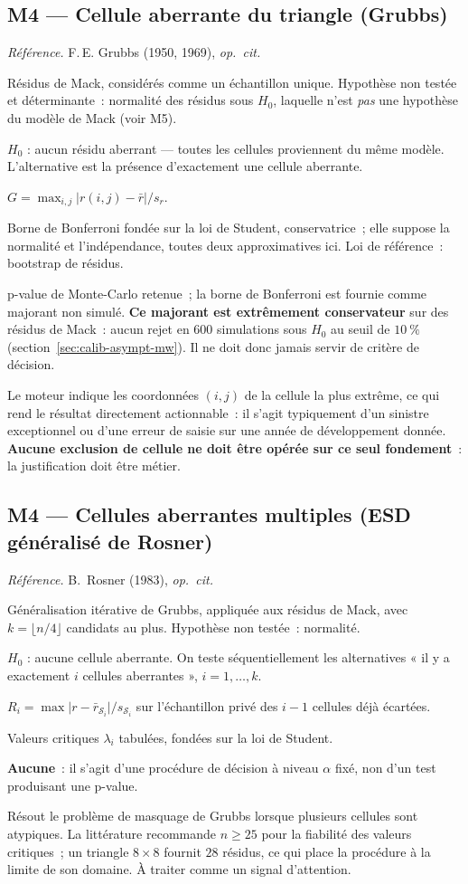 \documentclass[a4paper,11pt]{article}
\newcommand{\refl}[1]{{\small\textcolor{maincolor!70!black}{\textit{Référence.} #1}}\par\smallskip}
\newcounter{ficheid}
\newenvironment{fiche}[1]{%
  \stepcounter{ficheid}%
  \phantomsection
  \subsection{#1}%
  \label{fiche:\theficheid}%
}{%
  \end{description}\vspace{0.5em}%
}
\newcommand{\Cadre}{%
  \begin{description}[leftmargin=0pt, style=unboxed, itemsep=3pt, topsep=3pt, parsep=2pt]%
  \item[\textcolor{financeblue}{\textbf{1. Cadre, notations et hypothèses de validité (non testées).}}]}
\newcommand{\Hzero}{\item[\textcolor{financeblue}{\textbf{2. Hypothèse nulle.}}]}
\newcommand{\Stat}{\item[\textcolor{financeblue}{\textbf{3. Statistique de test.}}]}
\newcommand{\Loi}{\item[\textcolor{financeblue}{\textbf{4. Loi sous $H_0$.}}]}
\newcommand{\Pval}{\item[\textcolor{financeblue}{\textbf{5. p-value.}}]}
\newcommand{\Usage}{\item[\textcolor{financeblue}{\textbf{6. Usage et limites.}}]}
\begin{document}
\begin{fiche}{M4 --- Cellule aberrante du triangle (Grubbs)}
\label{mw:m4gr}
\refl{F.\,E. Grubbs (1950, 1969), \emph{op.\ cit.}}
\Cadre
Résidus de Mack, considérés comme un échantillon unique. Hypothèse non testée et
déterminante~: normalité des résidus sous $H_0$, laquelle n'est \emph{pas} une
hypothèse du modèle de Mack (voir M5).
\Hzero
$H_0$ : aucun résidu aberrant --- toutes les cellules proviennent du même modèle.
L'alternative est la présence d'exactement une cellule aberrante.
\Stat
$G = \max_{i,j}\big|r(i,j) - \bar r\big| / s_r$.
\Loi
Borne de Bonferroni fondée sur la loi de Student, conservatrice~; elle suppose la
normalité et l'indépendance, toutes deux approximatives ici. Loi de référence~:
bootstrap de résidus.
\Pval
p-value de Monte-Carlo retenue~; la borne de Bonferroni est fournie comme
majorant non simulé. \textbf{Ce majorant est extrêmement conservateur} sur des
résidus de Mack~: aucun rejet en 600 simulations sous $H_0$ au seuil de $10~\%$
(section~\ref{sec:calib-asympt-mw}). Il ne doit donc jamais servir de critère de
décision.
\Usage
Le moteur indique les coordonnées $(i,j)$ de la cellule la plus extrême, ce qui
rend le résultat directement actionnable~: il s'agit typiquement d'un sinistre
exceptionnel ou d'une erreur de saisie sur une année de développement donnée.
\textbf{Aucune exclusion de cellule ne doit être opérée sur ce seul fondement}~:
la justification doit être métier.
\end{fiche}

\begin{fiche}{M4 --- Cellules aberrantes multiples (ESD généralisé de Rosner)}
\label{mw:m4ros}
\refl{B.~Rosner (1983), \emph{op.\ cit.}}
\Cadre
Généralisation itérative de Grubbs, appliquée aux résidus de Mack, avec
$k = \lfloor n/4 \rfloor$ candidats au plus. Hypothèse non testée~: normalité.
\Hzero
$H_0$ : aucune cellule aberrante. On teste séquentiellement les alternatives
« il y a exactement $i$ cellules aberrantes », $i = 1,\dots,k$.
\Stat
$R_i = \max\big|r - \bar r_{\mathcal{S}_i}\big| / s_{\mathcal{S}_i}$ sur
l'échantillon privé des $i-1$ cellules déjà écartées.
\Loi
Valeurs critiques $\lambda_i$ tabulées, fondées sur la loi de Student.
\Pval
\textbf{Aucune}~: il s'agit d'une procédure de décision à niveau $\alpha$ fixé,
non d'un test produisant une p-value.
\Usage
Résout le problème de masquage de Grubbs lorsque plusieurs cellules sont
atypiques. La littérature recommande $n \ge 25$ pour la fiabilité des valeurs
critiques~; un triangle $8\times8$ fournit $28$ résidus, ce qui place la
procédure à la limite de son domaine. À traiter comme un signal d'attention.
\end{fiche}
\end{document}
